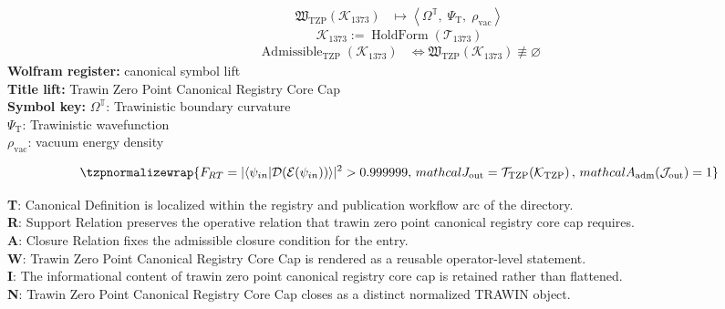 \noindent
\begin{minipage}[t]{0.48\linewidth}
\begingroup
\small
\[
\begin{aligned}
\mathfrak{W}_{\mathrm{TZP}}\!\left(\mathcal{K}_{1373}\right)
&\longmapsto
\left\langle \Omega^{\mathbb{T}},\; \Psi_{\mathrm{T}},\; \rho_{\mathrm{vac}} \right\rangle
\end{aligned}
\]
\[
\mathcal{K}_{1373}
:=
\operatorname{HoldForm}\!\left(\mathcal{T}_{1373}\right)
\]
\[
\begin{aligned}
\operatorname{Admissible}_{\mathrm{TZP}}\!\left(\mathcal{K}_{1373}\right)
&\Longleftrightarrow
\mathfrak{W}_{\mathrm{TZP}}\!\left(\mathcal{K}_{1373}\right)\not\equiv\varnothing
\end{aligned}
\]
\textbf{Wolfram register:} canonical symbol lift\\
\textbf{Title lift:} Trawin Zero Point Canonical Registry Core Cap\\
\textbf{Symbol key:} \(\Omega^{\mathbb{T}}\): Trawinistic boundary curvature\\ \(\Psi_{\mathrm{T}}\): Trawinistic wavefunction\\ \(\rho_{\mathrm{vac}}\): vacuum energy density
\par
\endgroup
\end{minipage}\hfill
\begin{minipage}[t]{0.48\linewidth}
\[
\tzpnormalizewrap{F_{RT} = |\langle \psi_{in} \lvert \mathcal{D}(\mathcal{E}(\psi_{in})) \rangle|^2 > 0.999999,\,mathcal{J}_{\mathrm{out}} = \mathcal{T}_{\mathrm{TZP}}\!\left(\mathcal{K}_{\mathrm{TZP}}\right),\,mathcal{A}_{\mathrm{adm}}\!\left(\mathcal{J}_{\mathrm{out}}\right)=1}
\]

\small
\textbf{T}: Canonical Definition is localized within the registry and publication workflow arc of the directory.\\
\textbf{R}: Support Relation preserves the operative relation that trawin zero point canonical registry core cap requires.\\
\textbf{A}: Closure Relation fixes the admissible closure condition for the entry.\\
\textbf{W}: Trawin Zero Point Canonical Registry Core Cap is rendered as a reusable operator-level statement.\\
\textbf{I}: The informational content of trawin zero point canonical registry core cap is retained rather than flattened.\\
\textbf{N}: Trawin Zero Point Canonical Registry Core Cap closes as a distinct normalized TRAWIN object.
\normalsize
\end{minipage}

